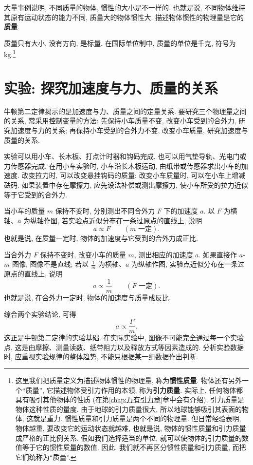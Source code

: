 \documentclass[UTF8,openany,fontset=fandol]{ctexbook}
\theoremstyle{chinesetextbook}
\begin{document}
大量事例说明, 不同质量的物体, 惯性的大小是不一样的. 也就是说, 不同物体维持其原有运动状态的能力不同, 质量大的物体惯性大. 描述物体惯性的物理量是它的\textbf{质量}.

质量只有大小, 没有方向, 是标量. 在国际单位制中, 质量的单位是千克, 符号为 kg.\footnote{这里我们把质量定义为描述物体惯性的物理量, 称为\textbf{惯性质量}. 物体还有另外一个“质量”, 它描述物体受引力作用的本领, 称为\textbf{引力质量}. 实际上, 任何物体都具有吸引其他物体的性质 (在第\ref{chap:万有引力章}章中会有介绍), 引力质量是物体这种性质的量度. 由于地球的引力质量很大, 所以地球能够吸引其表面的物体, 这就是重力. 惯性质量和引力质量是两个不同的物理量. 但日常经验表明, 物体越重, 要改变它的运动状态就越难, 也就是说, 物体的惯性质量和引力质量成严格的正比例关系. 假如我们选择适当的单位, 就可以使物体的引力质量的数值等于它的惯性质量的数值. 因此, 我们就不再区分惯性质量和引力质量, 而把它们统称为“质量”.}
\section{实验: 探究加速度与力、质量的关系}
牛顿第二定律揭示的是加速度与力、质量之间的定量关系. 要研究三个物理量之间的关系, 常采用控制变量的方法: 先保持小车质量不变, 改变小车受到的合外力, 研究加速度与力的关系; 再保持小车受到的合外力不变, 改变小车质量, 研究加速度与质量的关系.

实验可以用小车、长木板、打点计时器和钩码完成, 也可以用气垫导轨、光电门或力传感器完成. 在用小车实验时, 小车沿长木板运动, 由纸带或传感器求出小车的加速度. 改变拉力时, 可以改变悬挂钩码的质量; 改变小车质量时, 可以在小车上增减砝码. 如果装置中存在摩擦力, 应先设法补偿或测出摩擦力, 使小车所受的拉力近似等于它受到的合外力.

当小车的质量 $m$ 保持不变时, 分别测出不同合外力 $F$ 下的加速度 $a$. 以 $F$ 为横轴、$a$ 为纵轴作图, 若实验点近似分布在一条过原点的直线上, 说明
\[
a\propto F\qquad(m\text{ 一定}).
\]
也就是说, 在质量一定时, 物体的加速度与它受到的合外力成正比.

当合外力 $F$ 保持不变时, 改变小车的质量 $m$, 测出相应的加速度 $a$. 如果直接作 $a$-$m$ 图像, 图像不是直线; 若以 $\displaystyle\frac{1}{m}$ 为横轴、$a$ 为纵轴作图, 实验点近似分布在一条过原点的直线上, 说明
\[
a\propto\frac{1}{m}\qquad(F\text{ 一定}).
\]
也就是说, 在合外力一定时, 物体的加速度与质量成反比.

综合两个实验结论, 可得
\[
a\propto\frac{F}{m}.
\]
这正是牛顿第二定律的实验基础. 在实际实验中, 图像不可能完全通过每一个实验点, 这是由摩擦、测量读数、纸带阻力以及释放方式等因素造成的. 分析实验数据时, 应重视实验规律的整体趋势, 不能只根据某一组数据作出判断.
\end{document}
